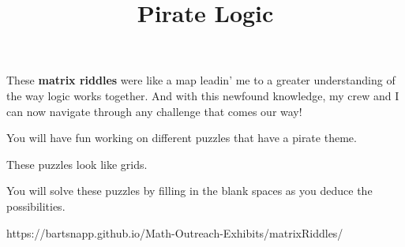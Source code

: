 \documentclass{../exhibit}
\title{Pirate Logic}
\begin{document}
\begin{context}
These \textbf{matrix riddles} were like a map leadin' me to a greater understanding of the way logic works together. And with this newfound knowledge, my crew and I can now navigate through any challenge that comes our way!
\end{context}

\begin{directions}
  You will have fun working on different puzzles that have a pirate theme.

  These puzzles look like grids.

  You will solve these puzzles by filling in the blank spaces as you
deduce the possibilities.
\end{directions}

\begin{example}
\end{example}

\begin{mathConnections}
  https://bartsnapp.github.io/Math-Outreach-Exhibits/matrixRiddles/
\end{mathConnections}
\end{document}
